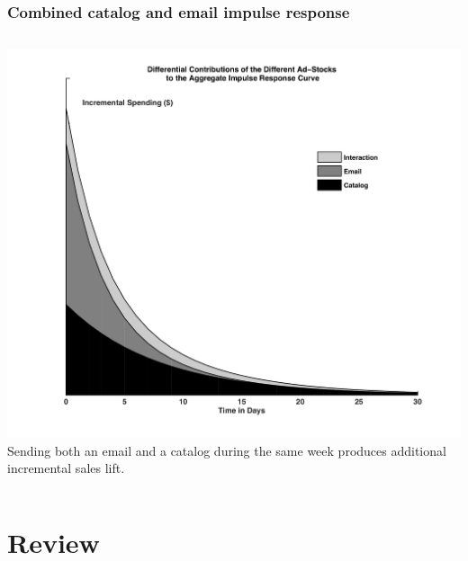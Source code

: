 \documentclass[10pt, aspectratio=169]{beamer}
\begin{document}
\begin{frame}
\frametitle{Combined catalog and email impulse response}
\begin{columns}
\centering
\includegraphics[width=\textwidth]{images/CIR_CUM_PLOT_2.pdf} \\
\footnotesize
Sending both an email and a catalog during the same week produces additional incremental sales lift.\\
\end{columns}
\end{frame}

\section{Review}
\end{document}
